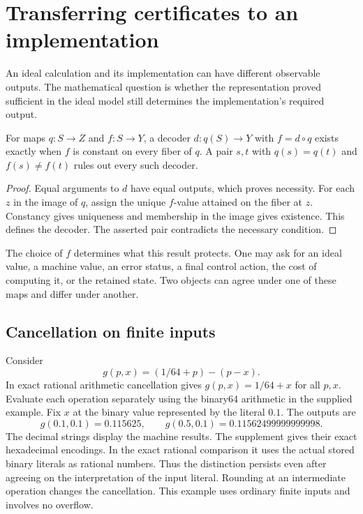 \section{Transferring certificates to an implementation}\label{sec:semantics}
An ideal calculation and its implementation can have different observable outputs. The mathematical question is whether the representation proved sufficient in the ideal model still determines the implementation's required output.

\begin{theorem}\label{thm:semanticfactor}
For maps $q:S\to Z$ and $f:S\to Y$, a decoder $d:q(S)\to Y$ with $f=d\circ q$ exists exactly when $f$ is constant on every fiber of $q$. A pair $s,t$ with $q(s)=q(t)$ and $f(s)\ne f(t)$ rules out every such decoder.
\end{theorem}
\begin{proof}
Equal arguments to $d$ have equal outputs, which proves necessity. For each $z$ in the image of $q$, assign the unique $f$-value attained on the fiber at $z$. Constancy gives uniqueness and membership in the image gives existence. This defines the decoder. The asserted pair contradicts the necessary condition.
\end{proof}
The choice of $f$ determines what this result protects. One may ask for an ideal value, a machine value, an error status, a final control action, the cost of computing it, or the retained state. Two objects can agree under one of these maps and differ under another.

\subsection{Cancellation on finite inputs}
Consider
\[
g(p,x)=(1/64+p)-(p-x).
\]
In exact rational arithmetic cancellation gives $g(p,x)=1/64+x$ for all $p,x$. Evaluate each operation separately using the binary64 arithmetic in the supplied example. Fix $x$ at the binary value represented by the literal $0.1$. The outputs are
\[
 g(0.1,0.1)=0.115625,\qquad g(0.5,0.1)=0.11562499999999998.
\]
The decimal strings display the machine results. The supplement gives their exact hexadecimal encodings. In the exact rational comparison it uses the actual stored binary literals as rational numbers. Thus the distinction persists even after agreeing on the interpretation of the input literal. Rounding at an intermediate operation changes the cancellation. This example uses ordinary finite inputs and involves no overflow.

